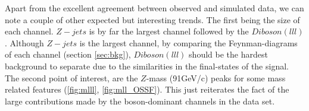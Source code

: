 Apart from the excellent agreement between observed and simulated data, we can note a couple of other expected
but interesting trends. The first being the size of each channel. $Z-jets$ is by far the largest channel followed
by the $Diboson (lll)$. Although $Z-jets$ is the largest channel, by comparing the Feynman-diagrams of each channel
(section \ref{sec:bkg}), $Diboson(lll)$ should be the hardest background to separate due to the similarities in the 
final-states of the signal. The second point of interest, are the $Z$-mass (91GeV/c) peaks for some mass related features
(\ref{fig:mlll}, \ref{fig:mll_OSSF}). This just reiterates the fact of the large contributions made by the boson-dominant 
channels in the data set.
\begin{figure}
\end{figure}
